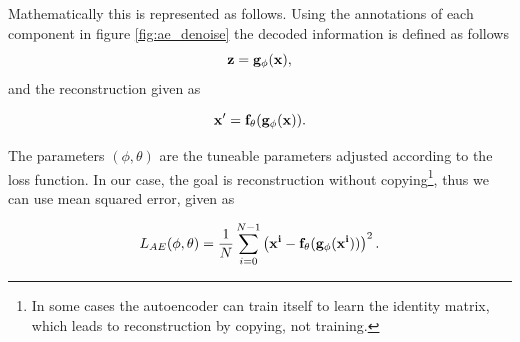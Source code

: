 Mathematically this is represented as follows\cite{weng2018VAE}. Using the annotations of each component in figure \ref{fig:ae_denoise} the decoded information is defined as follows 
\begin{equation*}
    \bf{z} = g_{\phi}(\bf{x}),
\end{equation*}    
and the reconstruction given as 

\begin{equation*}
    \bf{x'} = f_{\theta}(g_{\phi}(\bf{x})).
\end{equation*}  

The parameters $(\phi,\theta)$ are the tuneable parameters adjusted according to the loss function. In our case, the goal is
reconstruction without copying\footnote{In some cases the autoencoder can train itself to learn the identity matrix, 
which leads to reconstruction by copying, not training.}, thus we can use mean squared error, given as 

\begin{equation}\label{eq:loss_ae}
    L_{AE} (\phi,\theta) = \frac{1}{N}\sum_{i=0}^{N-1} \left(\bf{x}^{i} - f_{\theta}(g_{\phi}(\bf{x}^{i}))\right)^{2}.
\end{equation}

